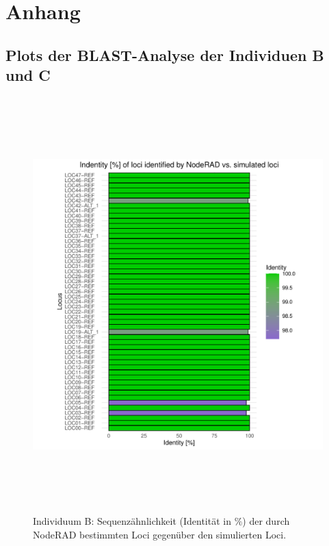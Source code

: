 \chapter{Anhang}
\section{Plots der BLAST-Analyse der Individuen B und C}

\begin{figure}[H]
	\begin{center}
		\includegraphics[height=16cm]{bilder/evaluation/perc_ident/B.plot_loci.pdf}
		\caption{Individuum B: Sequenzähnlichkeit (Identität in $ \% $) der durch NodeRAD bestimmten Loci gegenüber den simulierten Loci.}
	\end{center}
\end{figure}

